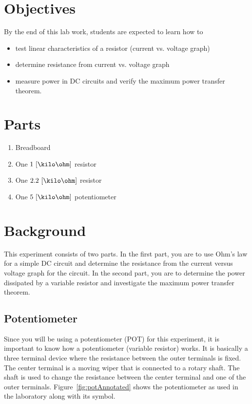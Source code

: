 
\section{Objectives}
By the end of this lab work, students are expected to learn how to 

\begin{itemize}
\item test linear characteristics of a resistor (current vs. voltage graph)
\item determine resistance from current vs. voltage graph 
\item measure power in DC circuits and verify the maximum power transfer theorem. 
\end{itemize}

\section{Parts}
\label{sec:partsEx2}

\begin{enumerate}
\item Breadboard    
\item One $1~[\kilo\ohm]$ resistor
  
\item One $2.2~[\kilo\ohm]$ resistor 
\item One $5~[\kilo\ohm]$ potentiometer
\end{enumerate}                    %



\section{Background}
\label{sec:background}
This experiment consists of two parts. In the first part, you are to use Ohm's law for  a simple DC circuit and determine the  resistance from the  current versus voltage graph for the circuit. In the second part, you are to determine the power dissipated by  a variable resistor and investigate the maximum power transfer theorem.

\subsection{Potentiometer}
Since you will be using a potentiometer (POT) for this experiment, it is important to know how a potentiometer (variable resistor) works. It is basically a three terminal device where the resistance between the outer terminals is fixed. The center terminal is a moving wiper that is connected to a rotary shaft.    The shaft is used to change the resistance between the center terminal and one of the outer terminals. Figure~\ref{fig:potAnnotated} shows the potentiometer as used in the laboratory along with its symbol.

